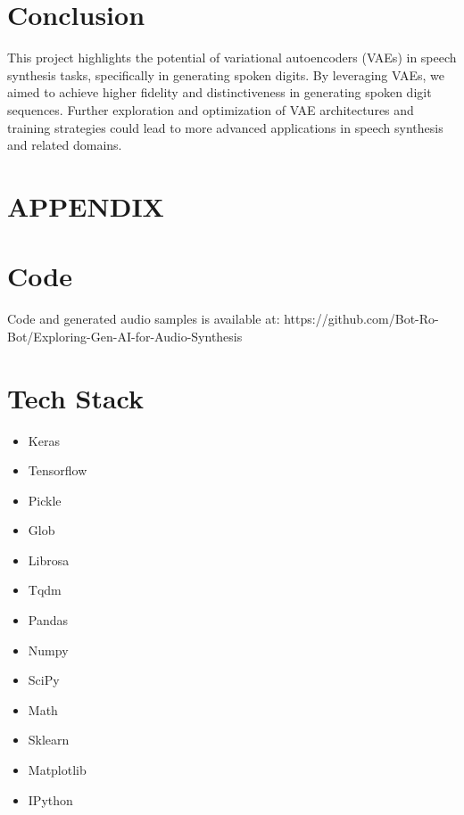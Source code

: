 \documentclass[12pt]{article}
\begin{document}
\section{Conclusion}
This project highlights the potential of variational autoencoders (VAEs) in speech synthesis tasks, specifically in generating spoken digits. By leveraging VAEs, we aimed to achieve higher fidelity and distinctiveness in generating spoken digit sequences. Further exploration and optimization of VAE architectures and training strategies could lead to more advanced applications in speech synthesis and related domains.






\section{APPENDIX}
\appendix
\section{Code}
Code and generated audio samples is available at: https://github.com/Bot-Ro-Bot/Exploring-Gen-AI-for-Audio-Synthesis 

\section{Tech Stack}
\begin{multicols}{4} %
\raggedright %
\begin{itemize}
    \item Keras
    \item Tensorflow
    \item Pickle
    \item Glob
    \item Librosa
    \item Tqdm
    \item Pandas
    \item Numpy
    \item SciPy
    \item Math
    \item Sklearn
    \item Matplotlib
    \item IPython
\end{itemize}
\end{multicols}
\end{document}
